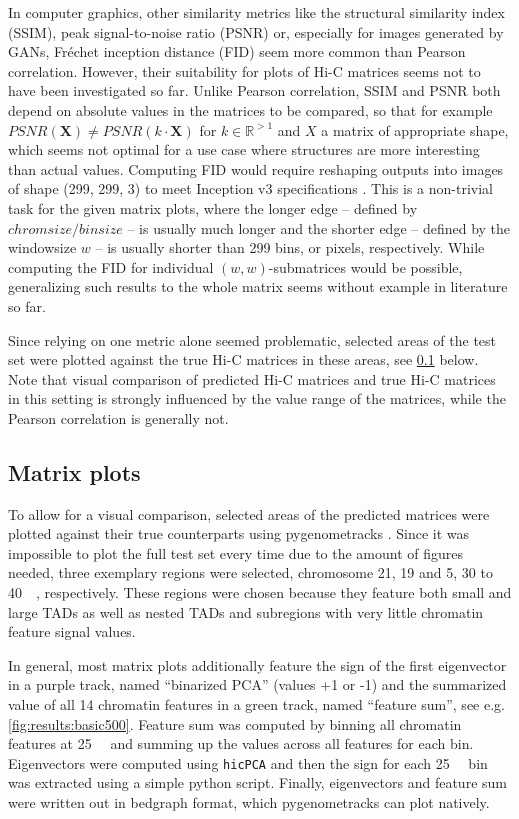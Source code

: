 In computer graphics, other similarity metrics like the structural similarity index (SSIM), peak signal-to-noise ratio (PSNR) or, especially for images generated by GANs, 
Fréchet inception distance (FID) seem more common than Pearson correlation.
However, their suitability for plots of Hi-C matrices seems not to have been investigated so far. 
Unlike Pearson correlation, SSIM and PSNR both depend on absolute values in the matrices to be compared, 
so that for example $\mathit{PSNR}(\mathbf{X}) \not=\mathit{PSNR}(k\cdot \mathbf{X})$ for $k\in\mathbb{R}^{>1}$ and $X$ a matrix of appropriate shape, 
which seems not optimal for a use case where structures are more interesting than actual values.
Computing FID would require reshaping outputs into images of shape (299, 299, 3) to meet Inception v3 specifications \cite{Szegedy2016}.
This is a non-trivial task for the given matrix plots,
where the longer edge -- defined by $\mathit{chromsize}/\mathit{binsize}$ -- is usually much longer 
and the shorter edge -- defined by the windowsize $w$ -- is usually shorter than 299 bins, or pixels, respectively.
While computing the FID for individual $(w,w)$-submatrices would be possible,
generalizing such results to the whole matrix seems without example in literature so far.

Since relying on one metric alone seemed problematic, selected areas of the test set were plotted against the true 
Hi-C matrices in these areas, see \cref{sec:methods:matrix_plots} below.
Note that visual comparison of predicted Hi-C matrices and true Hi-C matrices in this setting is strongly influenced by
the value range of the matrices, while the Pearson correlation is generally not.

\subsection{Matrix plots} \label{sec:methods:matrix_plots}
To allow for a visual comparison, selected areas of the predicted matrices were plotted against their true counterparts using pygenometracks \cite{LopezDelisle2020}.
Since it was impossible to plot the full test set every time due to the amount of figures needed, 
three exemplary regions were selected, chromosome 21, 19 and 5, 30 to \SI{40}{\mega\bp}, respectively. 
These regions were chosen because they feature both small and large TADs as well as nested TADs and subregions with very little chromatin feature signal values.

In general, most matrix plots additionally feature the sign of the first eigenvector in a purple track, named ``binarized PCA'' (values +1 or -1)
and the summarized value of all 14 chromatin features in a green track, named ``feature sum'', see e.g. \cref{fig:results:basic500}.
Feature sum was computed by binning all chromatin features at \SI{25}{\kilo\bp} and 
summing up the values across all features for each bin.
Eigenvectors were computed using \texttt{hicPCA} \cite{Wolff2018} and then the sign for each \SI{25}{\kilo\bp} bin was extracted using 
a simple python script. Finally, eigenvectors and feature sum were written out in bedgraph format, which pygenometracks can plot natively.

